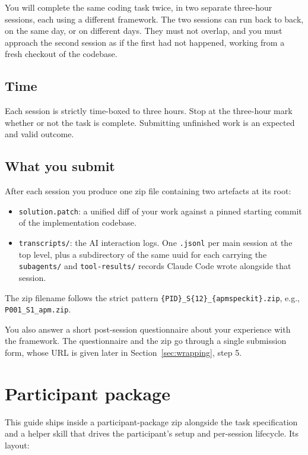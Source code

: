 \documentclass[11pt, a4paper]{article}
\begin{document}
You will complete the same coding task twice, in two separate three-hour sessions, each using a different framework. The two sessions can run back to back, on the same day, or on different days. They must not overlap, and you must approach the second session as if the first had not happened, working from a fresh checkout of the codebase.

\subsection{Time}
\label{sec:time}

Each session is strictly time-boxed to three hours. Stop at the three-hour mark whether or not the task is complete. Submitting unfinished work is an expected and valid outcome.

\subsection{What you submit}
\label{sec:whatyousubmit}

After each session you produce one zip file containing two artefacts at its root:

\begin{itemize}
    \item \texttt{solution.patch}: a unified diff of your work against a pinned starting commit of the implementation codebase.
    \item \texttt{transcripts/}: the AI interaction logs. One \texttt{.jsonl} per main session at the top level, plus a subdirectory of the same uuid for each carrying the \texttt{subagents/} and \texttt{tool-results/} records Claude Code wrote alongside that session.
\end{itemize}

The zip filename follows the strict pattern \texttt{\{PID\}\_S\{1\textbar{}2\}\_\{apm\textbar{}speckit\}.zip}, e.g., \texttt{P001\_S1\_apm.zip}.

You also answer a short post-session questionnaire about your experience with the framework. The questionnaire and the zip go through a single submission form, whose URL is given later in Section~\ref{sec:wrapping}, step 5.

\section{Participant package}
\label{sec:package}

This guide ships inside a participant-package zip alongside the task specification and a helper skill that drives the participant's setup and per-session lifecycle. Its layout:
\end{document}
